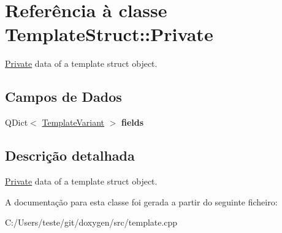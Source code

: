 \hypertarget{class_template_struct_1_1_private}{\section{Referência à classe Template\-Struct\-:\-:Private}
\label{class_template_struct_1_1_private}
}


\hyperlink{class_template_struct_1_1_private}{Private} data of a template struct object.  


\subsection*{Campos de Dados}
\begin{DoxyCompactItemize}
\item 
\hypertarget{class_template_struct_1_1_private_a19222a28c0aaecdfdab47b2928b40018}{Q\-Dict$<$ \hyperlink{class_template_variant}{Template\-Variant} $>$ {\bfseries fields}}\label{class_template_struct_1_1_private_a19222a28c0aaecdfdab47b2928b40018}

\end{DoxyCompactItemize}


\subsection{Descrição detalhada}
\hyperlink{class_template_struct_1_1_private}{Private} data of a template struct object. 

A documentação para esta classe foi gerada a partir do seguinte ficheiro\-:\begin{DoxyCompactItemize}
\item 
C\-:/\-Users/teste/git/doxygen/src/template.\-cpp\end{DoxyCompactItemize}
